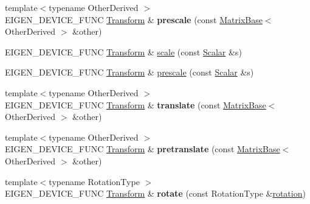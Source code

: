 \begin{DoxyCompactItemize}
{\footnotesize template$<$typename Other\+Derived $>$ }\\E\+I\+G\+E\+N\+\_\+\+D\+E\+V\+I\+C\+E\+\_\+\+F\+U\+NC \mbox{\hyperlink{class_eigen_1_1_transform}{Transform}} \& {\bfseries prescale} (const \mbox{\hyperlink{class_eigen_1_1_matrix_base}{Matrix\+Base}}$<$ Other\+Derived $>$ \&other)
\item 
E\+I\+G\+E\+N\+\_\+\+D\+E\+V\+I\+C\+E\+\_\+\+F\+U\+NC \mbox{\hyperlink{class_eigen_1_1_transform}{Transform}} \& \mbox{\hyperlink{class_eigen_1_1_transform_a7c4f178cd06d8352607a79804e23d275}{scale}} (const \mbox{\hyperlink{class_eigen_1_1_transform_a4e69ced9d651745b8ed4eda46f41795d}{Scalar}} \&s)
\item 
E\+I\+G\+E\+N\+\_\+\+D\+E\+V\+I\+C\+E\+\_\+\+F\+U\+NC \mbox{\hyperlink{class_eigen_1_1_transform}{Transform}} \& \mbox{\hyperlink{class_eigen_1_1_transform_adcf0b66220d062523c0e3bc0f99a28b1}{prescale}} (const \mbox{\hyperlink{class_eigen_1_1_transform_a4e69ced9d651745b8ed4eda46f41795d}{Scalar}} \&s)
\item 
\mbox{\label{class_eigen_1_1_transform_a565f857308ec682f5024de6ff6ba95bc}} 
{\footnotesize template$<$typename Other\+Derived $>$ }\\E\+I\+G\+E\+N\+\_\+\+D\+E\+V\+I\+C\+E\+\_\+\+F\+U\+NC \mbox{\hyperlink{class_eigen_1_1_transform}{Transform}} \& {\bfseries translate} (const \mbox{\hyperlink{class_eigen_1_1_matrix_base}{Matrix\+Base}}$<$ Other\+Derived $>$ \&other)
\item 
\mbox{\label{class_eigen_1_1_transform_adfe0510226fc613cae5967da061bb134}} 
{\footnotesize template$<$typename Other\+Derived $>$ }\\E\+I\+G\+E\+N\+\_\+\+D\+E\+V\+I\+C\+E\+\_\+\+F\+U\+NC \mbox{\hyperlink{class_eigen_1_1_transform}{Transform}} \& {\bfseries pretranslate} (const \mbox{\hyperlink{class_eigen_1_1_matrix_base}{Matrix\+Base}}$<$ Other\+Derived $>$ \&other)
\item 
\mbox{\label{class_eigen_1_1_transform_aca1de7ed883df538beff4b660fb67c95}} 
{\footnotesize template$<$typename Rotation\+Type $>$ }\\E\+I\+G\+E\+N\+\_\+\+D\+E\+V\+I\+C\+E\+\_\+\+F\+U\+NC \mbox{\hyperlink{class_eigen_1_1_transform}{Transform}} \& {\bfseries rotate} (const Rotation\+Type \&\mbox{\hyperlink{class_eigen_1_1_transform_a87eb429e076e2c15a1bfbe99b43ae07c}{rotation}})

\end{DoxyCompactItemize}
